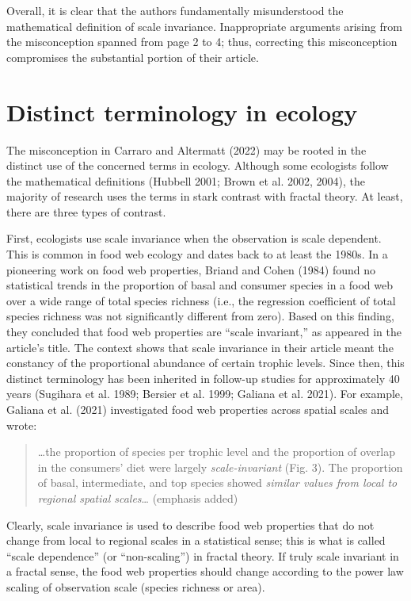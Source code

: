 \documentclass[
  12pt,
]{article}
\begin{document}
Overall, it is clear that the authors fundamentally misunderstood the mathematical definition of scale invariance. Inappropriate arguments arising from the misconception spanned from page 2 to 4; thus, correcting this misconception compromises the substantial portion of their article.

\hypertarget{distinct-terminology-in-ecology}{%
\section{Distinct terminology in ecology}\label{distinct-terminology-in-ecology}}

The misconception in Carraro and Altermatt (2022) may be rooted in the distinct use of the concerned terms in ecology. Although some ecologists follow the mathematical definitions (Hubbell 2001; Brown et al. 2002, 2004), the majority of research uses the terms in stark contrast with fractal theory. At least, there are three types of contrast.

First, ecologists use scale invariance when the observation is scale dependent. This is common in food web ecology and dates back to at least the 1980s. In a pioneering work on food web properties, Briand and Cohen (1984) found no statistical trends in the proportion of basal and consumer species in a food web over a wide range of total species richness (i.e., the regression coefficient of total species richness was not significantly different from zero). Based on this finding, they concluded that food web properties are ``scale invariant,'' as appeared in the article's title. The context shows that scale invariance in their article meant the constancy of the proportional abundance of certain trophic levels. Since then, this distinct terminology has been inherited in follow-up studies for approximately 40 years (Sugihara et al. 1989; Bersier et al. 1999; Galiana et al. 2021). For example, Galiana et al. (2021) investigated food web properties across spatial scales and wrote:

\begin{quote}
\ldots the proportion of species per trophic level and the proportion of overlap in the consumers' diet were largely \emph{scale-invariant} (Fig. 3). The proportion of basal, intermediate, and top species showed \emph{similar values from local to regional spatial scales}\ldots{} (emphasis added)
\end{quote}

Clearly, scale invariance is used to describe food web properties that do not change from local to regional scales in a statistical sense; this is what is called ``scale dependence'' (or ``non-scaling'') in fractal theory. If truly scale invariant in a fractal sense, the food web properties should change according to the power law scaling of observation scale (species richness or area).
\end{document}
